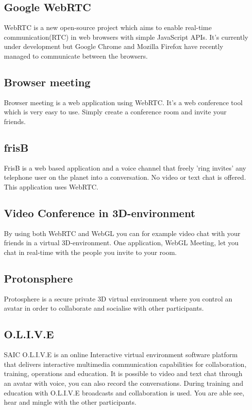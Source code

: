 \documentclass[12pt, titlepage]{article}
\begin{document}
\subsection{Google WebRTC}
WebRTC\cite{8} is a new open-source project which aims to enable real-time communication(RTC) in web browsers with simple JavaScript APIs. It's currently under development but Google Chrome and Mozilla Firefox have recently managed to communicate between the browsers\cite{9}.
\subsection{Browser meeting}
Browser meeting\cite{10} is a web application using WebRTC. It's a web conference tool which is very easy to use. Simply create a conference room and invite your friends.
\subsection{frisB}
FrisB\cite{11} is a web based application and a voice channel that freely 'ring invites' any telephone user on the planet into a conversation. No video or text chat is offered. This application uses WebRTC.
\subsection{Video Conference in 3D-environment}
By using both WebRTC and WebGL you can for example video chat with your friends in a virtual 3D-environment. One application, WebGL Meeting\cite{12}, let you chat in real-time with the people you invite to your room.
\subsection{Protonsphere}
Protosphere\cite{13} is a secure private 3D virtual environment where you control an avatar in order to collaborate and socialise with other participants.
\subsection{O.L.I.V.E}
SAIC O.L.I.V.E\cite{14} is an online Interactive virtual environment software platform that delivers interactive multimedia communication capabilities for collaboration, training, operations and education. It is possible to video and text chat through an avatar with voice, you can also record the conversations. During training and education with O.L.I.V.E broadcasts and collaboration is used. You are able see, hear and mingle with the other participants.
\end{document}
